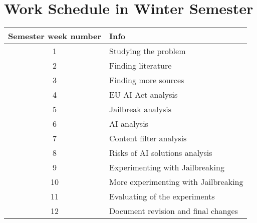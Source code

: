 \setcounter{figure}{0}
\setcounter{listing}{0}

\chapter{Work Schedule in Winter Semester \label{cha:work_schedule} }



\begin{table}[h]
    \centering
    \begin{tabular}{|c|l|}
    \hline
    \textbf{Semester week number} & \textbf{Info} \\ \hline

    1 & Studying the problem  \\ \hline
    2 & Finding literature \\ \hline
    3 & Finding more sources \\ \hline
    4 & EU AI Act analysis \\ \hline
    5 & Jailbreak analysis \\ \hline
    6 & AI analysis \\ \hline
    7 & Content filter analysis \\ \hline
    8 & Risks of AI solutions analysis \\ \hline
    9 & Experimenting with Jailbreaking \\ \hline
    10 & More experimenting with Jailbreaking \\ \hline
    11 & Evaluating of the experiments \\ \hline
    12 & Document revision and final changes \\ \hline
    \end{tabular}
\end{table}


